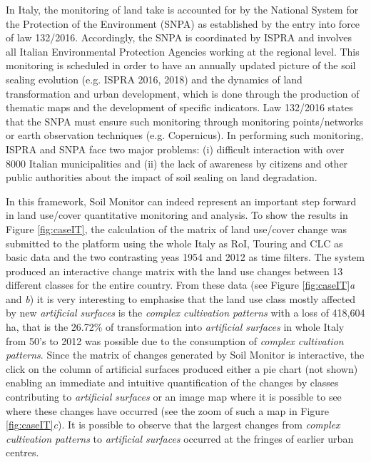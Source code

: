 \documentclass[APA,LATO1COL,doublespace]{WileyNJD-v2}
\begin{document}
In Italy, the monitoring of land take is accounted for by the National System for the Protection of the Environment (SNPA) as established by the entry into force of law 132/2016.
Accordingly, the SNPA is coordinated by ISPRA and involves all Italian Environmental Protection Agencies working at the regional level. 
This monitoring is scheduled in order to have an annually updated picture of the soil sealing evolution (e.g. ISPRA 2016, 2018) and the dynamics of land transformation and urban development, which is done through the production of thematic maps and the development of specific indicators. 
Law 132/2016 states that the SNPA must ensure such monitoring through monitoring points/networks or earth observation techniques (e.g. Copernicus).
In performing such monitoring, ISPRA and SNPA face two major problems: (i) difficult interaction with over 8000 Italian municipalities and (ii) the lack of awareness by citizens and other public authorities about the impact of soil sealing on land degradation.

In this framework, Soil Monitor can indeed represent an important step forward in land use/cover quantitative monitoring and analysis.
To show the results in Figure \ref{fig:caseIT}, the calculation of the matrix of land use/cover change was submitted to the platform using the whole Italy as RoI,
Touring and CLC as basic data and
the two contrasting yeas 1954 and 2012 as time filters.
The system produced an interactive change matrix with the land use changes between 13 different classes for the entire country.
From these data (see Figure \ref{fig:caseIT}\textit{a} and \textit{b}) it is very interesting to emphasise that the land use class mostly affected by new \textit{artificial surfaces} is the \textit{complex cultivation patterns} with a loss of 418,604 ha, that is the 26.72\% of transformation into \textit{artificial surfaces} in whole Italy from 50's to 2012 was possible due to the consumption of \textit{complex cultivation patterns}.
Since the matrix of changes generated by Soil Monitor is interactive, the click on the column of artificial surfaces produced either a pie chart (not shown) enabling an immediate and intuitive quantification of the changes by classes contributing to \textit{artificial surfaces} or an image map where it is possible to see where these changes have occurred (see the zoom of such a map in Figure \ref{fig:caseIT}\textit{c}).
It is possible to observe that the largest changes from \textit{complex cultivation patterns} to \textit{artificial surfaces} occurred at the fringes of earlier urban centres.
\end{document}
